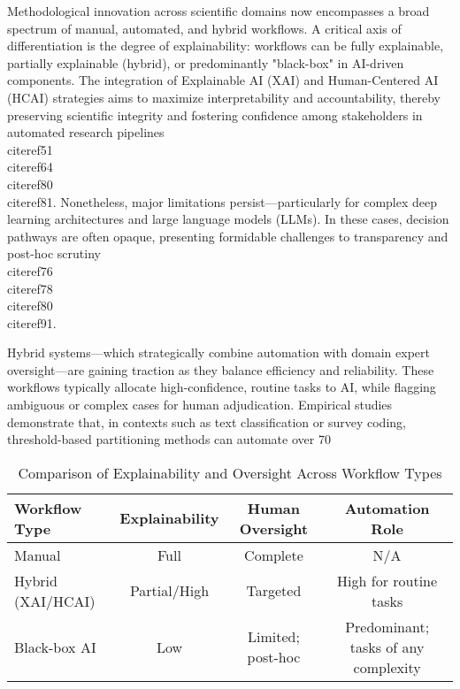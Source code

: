 \documentclass[11pt]{article}
\begin{document}
Methodological innovation across scientific domains now encompasses a broad spectrum of manual, automated, and hybrid workflows. A critical axis of differentiation is the degree of explainability: workflows can be fully explainable, partially explainable (hybrid), or predominantly "black-box" in AI-driven components. The integration of Explainable AI (XAI) and Human-Centered AI (HCAI) strategies aims to maximize interpretability and accountability, thereby preserving scientific integrity and fostering confidence among stakeholders in automated research pipelines \\cite{ref51}\\cite{ref64}\\cite{ref80}\\cite{ref81}. Nonetheless, major limitations persist—particularly for complex deep learning architectures and large language models (LLMs). In these cases, decision pathways are often opaque, presenting formidable challenges to transparency and post-hoc scrutiny \\cite{ref76}\\cite{ref78}\\cite{ref80}\\cite{ref91}.

Hybrid systems—which strategically combine automation with domain expert oversight—are gaining traction as they balance efficiency and reliability. These workflows typically allocate high-confidence, routine tasks to AI, while flagging ambiguous or complex cases for human adjudication. Empirical studies demonstrate that, in contexts such as text classification or survey coding, threshold-based partitioning methods can automate over 70%

\begin{table}[ht]
\centering
\caption{Comparison of Explainability and Oversight Across Workflow Types}
\label{tab:workflow_explainability}
\begin{tabular}{|l|c|c|c|}
\hline
\textbf{Workflow Type} & \textbf{Explainability} & \textbf{Human Oversight} & \textbf{Automation Role} \\
\hline
Manual & Full & Complete & N/A \\
Hybrid (XAI/HCAI) & Partial/High & Targeted & High for routine tasks \\
Black-box AI & Low & Limited; post-hoc & Predominant; tasks of any complexity \\
\hline
\end{tabular}
\end{table}
\end{document}
